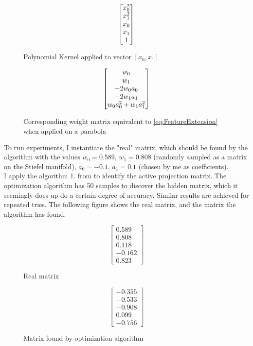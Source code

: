 \begin{figure}[h]

\begin {minipage}{0.47\textwidth}
  \centering
  \begin{equation}
    \begin{bmatrix} x_0^2 \\ x_1^2 \\ x_0 \\ x_1 \\ 1 \end{bmatrix}
  \end{equation}
  \caption{Polynomial Kernel applied to vector $[x_0, x_1]$}
\end{minipage}
\hfill
\begin {minipage}{0.47\textwidth}
  \centering
  \begin{equation}
    \begin{bmatrix} w_0 \\ w_1 \\ -2 w_0 a_0 \\ -2 w_1 a_1 \\ w_0 a_0^2 + w_1 a_1^2 \end{bmatrix}
  \end{equation}
  \caption{Corresponding weight matrix equivalent to \ref{eq:FeatureExtension} when applied on a parabola}
\end{minipage}

\end{figure}

To run experiments, I instantiate the "real" matrix, which should be found by the algorithm with the values $w_0 = 0.589$, $w_1 = 0.808$ (randomly sampled as a matrix on the Stiefel manifold), $a_0 = -0.1$, $a_1 = 0.1$ (chosen by me as coefficients). \\

I apply the algorithm 1. from \citep{Tripathy} to identify the active projection matrix.
The optimization algorithm has 50 samples to discover the hidden matrix, which it seemingly does up do a certain degree of accuracy.
Similar results are achieved for repeated tries.
The following figure shows the real matrix, and the matrix the algorithm has found.

\def\realW{
\begin{bmatrix}
	0.589 \\
    0.808 \\
	0.118 \\
	-0.162 \\
	0.823
\end{bmatrix}}

\def\okW1{
\begin{bmatrix}
	-0.355 \\
    	-0.533 \\
    	-0.908 \\
    	0.099 \\
    -0.756 
\end{bmatrix}}

\begin{figure}[h] 
\begin {minipage}{0.47\textwidth}
  \centering
  \begin{equation} \label{fig:realMatrix}
    \realW
  \end{equation}
  \caption{Real matrix}
\end{minipage}
\hfill
\begin {minipage}{0.47\textwidth}
  \centering
  \begin{equation} \label{fig:foundMatrix}
    \okW1
  \end{equation}
  \caption{Matrix found by optimization algorithm}
\end{minipage}
\end{figure}

